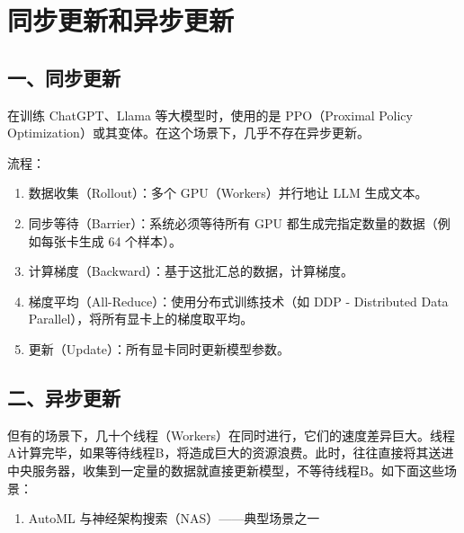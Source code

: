 \setcounter{section}{3}

\hypertarget{ux540cux6b65ux66f4ux65b0ux548cux5f02ux6b65ux66f4ux65b0}{%
\section{同步更新和异步更新}\label{ux540cux6b65ux66f4ux65b0ux548cux5f02ux6b65ux66f4ux65b0}}

\hypertarget{ux4e00ux540cux6b65ux66f4ux65b0}{%
\subsection{一、同步更新}\label{ux4e00ux540cux6b65ux66f4ux65b0}}

在训练 ChatGPT、Llama 等大模型时，使用的是 PPO（Proximal Policy Optimization）或其变体。在这个场景下，几乎不存在异步更新。

流程：

\begin{enumerate}
\def\labelenumi{\arabic{enumi}.}
\tightlist
\item
  数据收集（Rollout）：多个 GPU（Workers）并行地让 LLM 生成文本。
\item
  同步等待（Barrier）：系统必须等待所有 GPU 都生成完指定数量的数据（例如每张卡生成 64 个样本）。
\item
  计算梯度（Backward）：基于这批汇总的数据，计算梯度。
\item
  梯度平均（All-Reduce）：使用分布式训练技术（如 DDP - Distributed Data Parallel），将所有显卡上的梯度取平均。
\item
  更新（Update）：所有显卡同时更新模型参数。
\end{enumerate}

\hypertarget{ux4e8cux5f02ux6b65ux66f4ux65b0}{%
\subsection{二、异步更新}\label{ux4e8cux5f02ux6b65ux66f4ux65b0}}

但有的场景下，几十个线程（Workers）在同时进行，它们的速度差异巨大。线程A计算完毕，如果等待线程B，将造成巨大的资源浪费。此时，往往直接将其送进中央服务器，收集到一定量的数据就直接更新模型，不等待线程B。如下面这些场景：

\begin{enumerate}
\def\labelenumi{\arabic{enumi}.}
\tightlist
\item
  AutoML 与神经架构搜索（NAS）------典型场景之一
\end{enumerate}

